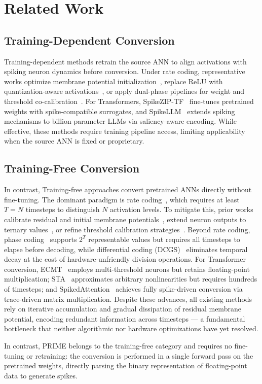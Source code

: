 \section{Related Work}












\subsection{Training-Dependent Conversion}
 
Training-dependent methods retrain the source ANN to align activations with spiking neuron dynamics before conversion. Under rate coding, representative works optimize membrane potential initialization~\cite{bu2022optimized}, replace ReLU with quantization-aware activations~\cite{bu2023optimal}, or apply dual-phase pipelines for weight and threshold co-calibration~\cite{ding2021optimal, wang2022towards}. For Transformers, SpikeZIP-TF~\cite{you2024spikezip} fine-tunes pretrained weights with spike-compatible surrogates, and SpikeLLM~\cite{xing2024spikellm} extends spiking mechanisms to billion-parameter LLMs via saliency-aware encoding. While effective, these methods require training pipeline access, limiting applicability when the source ANN is fixed or proprietary.

\subsection{Training-Free Conversion}
 
In contrast, Training-free approaches convert pretrained ANNs directly without fine-tuning. The dominant paradigm is rate coding~\cite{rueckauer2017conversion, diehl2015fast}, which requires at least $T = N$ timesteps to distinguish $N$ activation levels. To mitigate this, prior works calibrate residual and initial membrane potentials~\cite{hao2023reducing, hao2023bridging}, extend neuron outputs to ternary values~\cite{wang2022signed}, or refine threshold calibration strategies~\cite{wang2025adaptive, bu2025inference}. Beyond rate coding, phase coding~\cite{kim2018deep, wang2022efficient} supports $2^T$ representable values but requires all timesteps to elapse before decoding, while differential coding (DCGS)~\cite{huang2025differential} eliminates temporal decay at the cost of hardware-unfriendly division operations. For Transformer conversion, ECMT~\cite{huang2024towards} employs multi-threshold neurons but retains floating-point multiplication; STA~\cite{jiang2024spatio} approximates arbitrary nonlinearities but requires hundreds of timesteps; and SpikedAttention~\cite{hwang2024spikedattention} achieves fully spike-driven conversion via trace-driven matrix multiplication. 
Despite these advances, all existing methods rely on iterative accumulation and gradual dissipation of residual membrane potential, encoding redundant information across timesteps — a fundamental bottleneck that neither algorithmic nor hardware optimizations have yet resolved.

In contrast, PRIME belongs to the training-free category and requires no fine-tuning or retraining: the conversion is performed in a single forward pass on the pretrained weights, directly parsing the binary representation of floating-point data to generate spikes.
